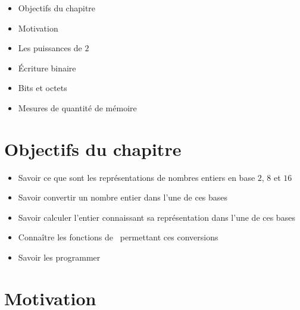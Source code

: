 \begin{frame}
  
  \debutmontitre

  \pause

{\footnotesize
\hfil\qquad\qquad\qquad\qquad
{}
\begin{minipage}{0.6\textwidth}
  \begin{itemize}
    \item<3-> Objectifs du chapitre
    \item<4-> Motivation
    \item<5-> Les puissances de $2$
    \item<6-> \'Ecriture binaire 
    \item<7-> Bits et octets
    \item<8-> Mesures de quantité de mémoire   
  \end{itemize}
\end{minipage}
}

\end{frame}

\setcounter{framenumber}{0}

\section{Objectifs du chapitre}

\begin{frame}


\begin{itemize}
\item<2-> Savoir ce que sont les représentations de nombres entiers en base $2$, $8$  et $16$
\item<3-> Savoir convertir un nombre entier dans l'une de ces bases
\item<4-> Savoir calculer l'entier connaissant sa représentation dans l'une de ces bases
\item<5-> Connaître les fonctions de \Python\ permettant ces conversions
\item<6->     Savoir les programmer
\end{itemize} 
\end{frame}



\section{Motivation}

